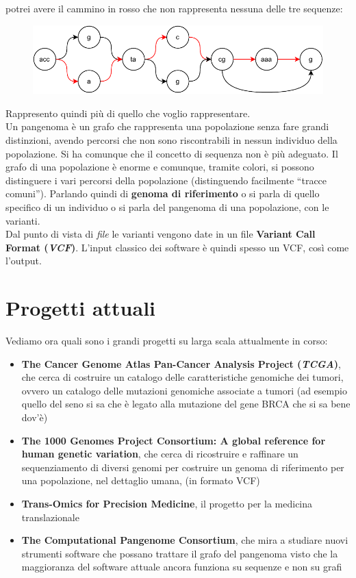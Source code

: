 \documentclass[a4paper,12pt, oneside]{book}
\begin{document}
potrei avere il cammino in rosso che non rappresenta nessuna delle tre sequenze:
\begin{figure}[H]
  \centering
  \includegraphics[width=\textwidth]{img/gra2.pdf}
\end{figure}
Rappresento quindi più di quello che voglio rappresentare.\\
Un pangenoma è un grafo che rappresenta una popolazione senza fare grandi
distinzioni, avendo percorsi che non sono riscontrabili in nessun individuo
della popolazione. Si ha comunque che il concetto di sequenza non è più
adeguato. Il grafo di una popolazione è enorme e comunque, tramite colori, si
possono distinguere i vari percorsi della popolazione (distinguendo facilmente
``tracce comuni''). Parlando quindi di \textbf{genoma di riferimento} o si parla
di quello specifico di un individuo o si parla del pangenoma di una popolazione,
con le varianti.\\
Dal punto di vista di \textit{file} le varianti vengono date in un file
\textbf{Variant Call Format (\textit{VCF})}. L'input classico dei software è
quindi spesso un VCF, così come l'output.
\section{Progetti attuali}
Vediamo ora quali sono i grandi progetti su larga scala attualmente in corso:
\begin{itemize}
  \item \textbf{The Cancer Genome Atlas Pan-Cancer Analysis Project
    (\textit{TCGA})}, che cerca di costruire un catalogo delle caratteristiche
  genomiche dei tumori, ovvero un catalogo delle mutazioni genomiche associate a
  tumori (ad esempio quello del seno si sa che è legato alla mutazione del gene
  BRCA che si sa bene dov'è)
  \item \textbf{The 1000 Genomes Project Consortium: A global reference for
    human genetic variation}, che cerca di ricostruire e raffinare un
  sequenziamento di diversi genomi per costruire 
  un genoma di riferimento per una popolazione, nel dettaglio umana, (in formato
  VCF) 
  \item \textbf{Trans-Omics for Precision Medicine}, il progetto per la medicina
  translazionale 
  \item \textbf{The Computational Pangenome Consortium}, che mira a studiare
  nuovi strumenti software che possano trattare il grafo del pangenoma visto che
  la maggioranza del software attuale ancora funziona su sequenze e non su grafi
\end{itemize}
\end{document}
